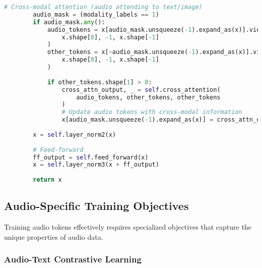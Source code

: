 \begin{lstlisting}[language=Python, caption=Multimodal transformer with audio token integration]
        # Cross-modal attention (audio attending to text/image)
        audio_mask = (modality_labels == 1)
        if audio_mask.any():
            audio_tokens = x[audio_mask.unsqueeze(-1).expand_as(x)].view(
                x.shape[0], -1, x.shape[-1]
            )
            other_tokens = x[~audio_mask.unsqueeze(-1).expand_as(x)].view(
                x.shape[0], -1, x.shape[-1]
            )
            
            if other_tokens.shape[1] > 0:
                cross_attn_output, _ = self.cross_attention(
                    audio_tokens, other_tokens, other_tokens
                )
                # Update audio tokens with cross-modal information
                x[audio_mask.unsqueeze(-1).expand_as(x)] = cross_attn_output.flatten()
        
        x = self.layer_norm2(x)
        
        # Feed-forward
        ff_output = self.feed_forward(x)
        x = self.layer_norm3(x + ff_output)
        
        return x
\end{lstlisting}

\subsection{Audio-Specific Training Objectives}

Training audio tokens effectively requires specialized objectives that capture the unique properties of audio data.

\subsubsection{Audio-Text Contrastive Learning}

